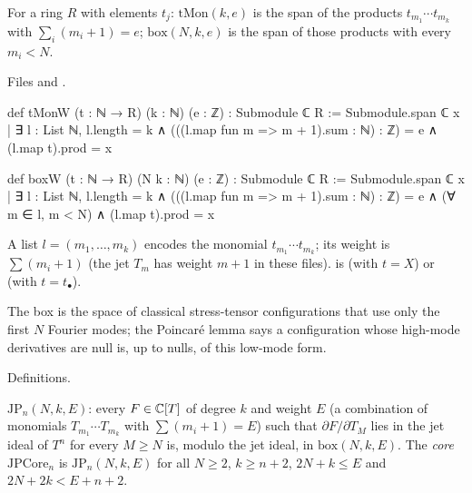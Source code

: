 \begin{definition}\label{l29:def:box}
For a ring $R$ with elements $t_j$: $\mathrm{tMon}(k,e)$ is the span of the products $t_{m_1}\cdots t_{m_k}$ with
$\sum_i(m_i+1)=e$; $\mathrm{box}(N,k,e)$ is the span of those products with every $m_i<N$.
\end{definition}

\noindent Files  and
.
\begin{leancode}
def tMonW (t : ℕ → R) (k : ℕ) (e : ℤ) : Submodule ℂ R :=
  Submodule.span ℂ
    {x | ∃ l : List ℕ, l.length = k ∧ (((l.map fun m => m + 1).sum : ℕ) : ℤ) = e ∧
      (l.map t).prod = x}

def boxW (t : ℕ → R) (N k : ℕ) (e : ℤ) : Submodule ℂ R :=
  Submodule.span ℂ {x | ∃ l : List ℕ, l.length = k ∧ (((l.map fun m => m + 1).sum : ℕ) : ℤ) = e ∧
    (∀ m ∈ l, m < N) ∧ (l.map t).prod = x}
\end{leancode}

\begin{dictionary}
A list $l=(m_1,\dots,m_k)$ encodes the monomial $t_{m_1}\cdots t_{m_k}$; its weight is $\sum(m_i+1)$ (the jet $T_m$ has
weight $m+1$ in these files).  is  (with $t=X$) or  (with $t=t_\bullet$).
\end{dictionary}

\begin{physics}
The box is the space of classical stress-tensor configurations that use only the first $N$ Fourier modes; the Poincar\'e
lemma says a configuration whose high-mode derivatives are null is, up to nulls, of this low-mode form.
\end{physics}

\begin{status}
Definitions.
\end{status}

\begin{definition}\label{l29:def:poincare}
$\mathrm{JP}_n(N,k,E)$: every $F\in{\mathbb{C}}[T]$ of degree $k$ and weight $E$ (a combination of monomials
$T_{m_1}\cdots T_{m_k}$ with $\sum(m_i+1)=E$) such that $\partial F/\partial T_M$ lies in the jet ideal of $T^n$ for every
$M\ge N$ is, modulo the jet ideal, in $\mathrm{box}(N,k,E)$. The \emph{core} $\mathrm{JPCore}_n$ is $\mathrm{JP}_n(N,k,E)$
for all $N\ge2$, $k\ge n+2$, $2N+k\le E$ and $2N+2k<E+n+2$.
\end{definition}

